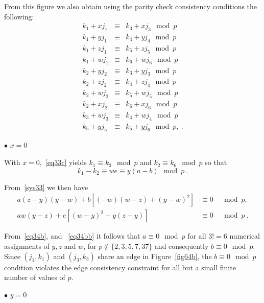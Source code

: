  From this figure we also obtain using the parity check
 consistency conditions the following:
\begin{equation}\label{eq33c}\begin{array}{cccc}
k_1+xj_1 & \equiv & k_3+xj_3 \mod p\\
k_1+yj_1 & \equiv & k_4+yj_4 \mod p\\
k_1+zj_1 & \equiv & k_5+zj_5 \mod p\\
k_1+wj_1 & \equiv & k_6+wj_6 \mod p\\
k_2+yj_2 & \equiv & k_3+yj_3 \mod p\\
k_2+zj_2 & \equiv & k_4+zj_4 \mod p\\
k_2+wj_2 & \equiv & k_5+wj_5 \mod p\\
k_2+xj_2 & \equiv & k_6+xj_6 \mod p\\
k_3+wj_3 & \equiv & k_4+wj_4 \mod p\\
k_5+yj_5 & \equiv & k_5+yj_6 \mod p,~.
\end{array}\end{equation}

$\bullet$ $x=0$

With $x=0$,~\eqref{eq33c} yields $k_1 \equiv k_3 \mod p$ and $k_2
\equiv k_6 \mod p$ so that
\begin{equation}\label{eq34b}
k_1 -k_2 \equiv we \equiv y(a-b) \mod p~.
\end{equation}


From~\eqref{sys33} we then have
\begin{equation}\label{eq34bb}\begin{array}{cccc}
a(z-y)(y-w)+b[(-w)(w-z)+(y-w)^2 ] &\equiv 0& \mod p,\\
aw(y-z)+e[(w-y)^2+y(z-y)] &\equiv 0& \mod p~.
\end{array}\end{equation}

From~\eqref{eq34b}, and ~\eqref{eq34bb} it follows that $a \equiv
0 \mod p$ for all $3!=6$ numerical assignments of $y,z$ and $w$,
for $p\notin \{2,3,5,7,37\}$ and consequently $b \equiv 0 \mod p$.
Since $(j_1,k_1)$ and $(j_3,k_3)$ share an edge in
Figure~\ref{fig64b}, the $b \equiv 0 \mod p$ condition violates
the edge consistency constraint for all but a small finite number
of values of $p$.

 $\bullet$ $y=0$

